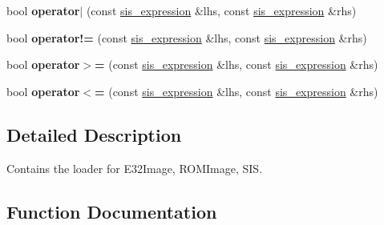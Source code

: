 \begin{DoxyCompactItemize}
\item 
\mbox{\label{namespaceeka2l1_1_1loader_ae8a3c4ded5b40e192a928a0128798a46}} 
bool {\bfseries operator$\vert$} (const \mbox{\hyperlink{structeka2l1_1_1loader_1_1sis__expression}{sis\+\_\+expression}} \&lhs, const \mbox{\hyperlink{structeka2l1_1_1loader_1_1sis__expression}{sis\+\_\+expression}} \&rhs)
\item 
\mbox{\label{namespaceeka2l1_1_1loader_a3e96772c7072b1e0611ef1c0e903796f}} 
bool {\bfseries operator!=} (const \mbox{\hyperlink{structeka2l1_1_1loader_1_1sis__expression}{sis\+\_\+expression}} \&lhs, const \mbox{\hyperlink{structeka2l1_1_1loader_1_1sis__expression}{sis\+\_\+expression}} \&rhs)
\item 
\mbox{\label{namespaceeka2l1_1_1loader_a8e2f197a0d4e1111d52f5eff6f597611}} 
bool {\bfseries operator$>$=} (const \mbox{\hyperlink{structeka2l1_1_1loader_1_1sis__expression}{sis\+\_\+expression}} \&lhs, const \mbox{\hyperlink{structeka2l1_1_1loader_1_1sis__expression}{sis\+\_\+expression}} \&rhs)
\item 
\mbox{\label{namespaceeka2l1_1_1loader_ad262245999cf25b042afb4ded8f03bf7}} 
bool {\bfseries operator$<$=} (const \mbox{\hyperlink{structeka2l1_1_1loader_1_1sis__expression}{sis\+\_\+expression}} \&lhs, const \mbox{\hyperlink{structeka2l1_1_1loader_1_1sis__expression}{sis\+\_\+expression}} \&rhs)
\end{DoxyCompactItemize}


\subsection{Detailed Description}
Contains the loader for E32\+Image, R\+O\+M\+Image, S\+IS. 

\subsection{Function Documentation}
\mbox{\label{namespaceeka2l1_1_1loader_ad99ba37ca491b1aadc1fdb7358119e69}} 
